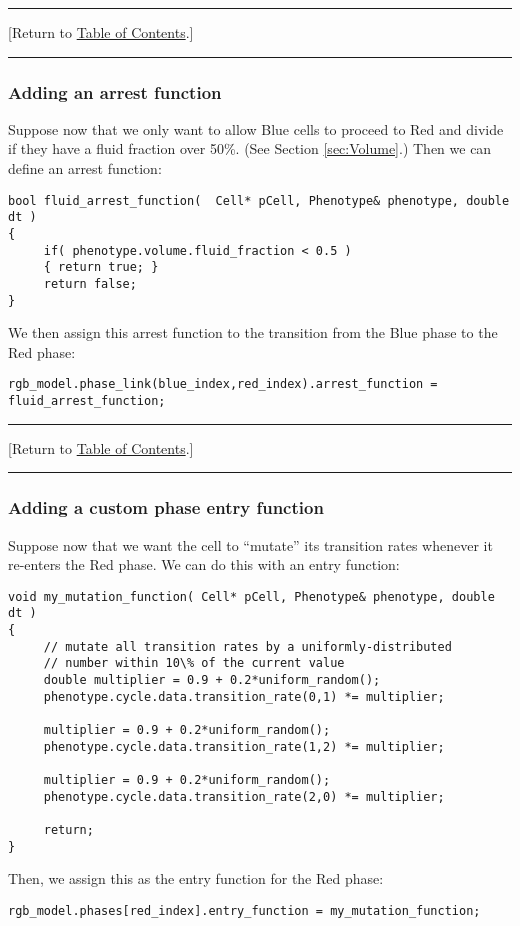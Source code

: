\documentclass[12pt]{article}
\newcommand{\TOClink}{\begin{center}\hrule\vskip-5pt\phantom{.}\hfill[Return to \hyperlink{TOC}{Table of Contents}.]\hfill\phantom{.}\vskip3pt\hrule\end{center}}
\begin{document}
\TOClink 

\subsubsection{Adding an arrest function}
\label{sec:Examples:arrest}
Suppose now that we only want to allow Blue cells to proceed to Red and divide if 
they have a fluid fraction over 50\%. (See Section \ref{sec:Volume}.) 
Then we can define an arrest function:
\begin{verbatim}
bool fluid_arrest_function(  Cell* pCell, Phenotype& phenotype, double dt )
{
     if( phenotype.volume.fluid_fraction < 0.5 )
     { return true; }
     return false; 
}
\end{verbatim}
We then assign this arrest function to the transition from the Blue phase to the Red phase: 
\begin{verbatim}
rgb_model.phase_link(blue_index,red_index).arrest_function = fluid_arrest_function; 
\end{verbatim}

\TOClink

\subsubsection{Adding a custom phase entry function}
\label{sec:Examples:phase_entry}
Suppose now that we want the cell to ``mutate'' its transition rates whenever it re-enters 
the Red phase. We can do this with an entry function: 
\begin{verbatim}
void my_mutation_function( Cell* pCell, Phenotype& phenotype, double dt )
{
     // mutate all transition rates by a uniformly-distributed 
     // number within 10\% of the current value
     double multiplier = 0.9 + 0.2*uniform_random(); 
     phenotype.cycle.data.transition_rate(0,1) *= multiplier; 

     multiplier = 0.9 + 0.2*uniform_random(); 
     phenotype.cycle.data.transition_rate(1,2) *= multiplier; 

     multiplier = 0.9 + 0.2*uniform_random(); 
     phenotype.cycle.data.transition_rate(2,0) *= multiplier; 

     return; 
}
\end{verbatim}

Then, we assign this as the entry function for the Red phase: 
\begin{verbatim}
rgb_model.phases[red_index].entry_function = my_mutation_function; 
\end{verbatim}
\end{document}
